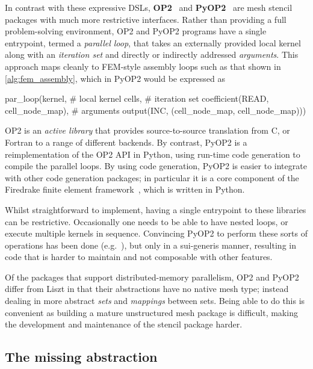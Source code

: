 \documentclass[thesis]{subfiles}
\begin{document}
In contrast with these expressive DSLs, \textbf{OP2}~\cite{mudaligeOP2ActiveLibrary2012} and \textbf{PyOP2}~\cite{rathgeberPyOP2HighLevelFramework2012} are mesh stencil packages with much more restrictive interfaces.
Rather than providing a full problem-solving environment, OP2 and PyOP2 programs have a single entrypoint, termed a \textit{parallel loop}, that takes an externally provided local kernel along with an \textit{iteration set} and directly or indirectly addressed \textit{arguments}.
This approach maps cleanly to FEM-style assembly loops such as that shown in \cref{alg:fem_assembly}, which in PyOP2 would be expressed as

\begin{pyinline}
  par_loop(kernel,                                       # local kernel
           cells,                                        # iteration set
           coefficient(READ, cell_node_map),             # arguments
           output(INC, (cell_node_map, cell_node_map)))
\end{pyinline}

OP2 is an \textit{active library} that provides source-to-source translation from C, \cplusplus or Fortran to a range of different backends.
By contrast, PyOP2 is a reimplementation of the OP2 API in Python, using run-time code generation to compile the parallel loops.
By using code generation, PyOP2 is easier to integrate with other code generation packages; in particular it is a core component of the Firedrake finite element framework~\cite{FiredrakeUserManual}, which is written in Python.

Whilst straightforward to implement, having a single entrypoint to these libraries can be restrictive.
Occasionally one needs to be able to have nested loops, or execute multiple kernels in sequence.
Convincing PyOP2 to perform these sorts of operations has been done (e.g.~\cite{gibsonSlateExtendingFiredrake2020,farrellPCPATCHSoftwareTopological2021}), but only in a sui-generis manner, resulting in code that is harder to maintain and not composable with other features.

Of the packages that support distributed-memory parallelism, OP2 and PyOP2 differ from Liszt in that their abstractions have no native mesh type; instead dealing in more abstract \textit{sets} and \textit{mappings} between sets.
Being able to do this is convenient as building a mature unstructured mesh package is difficult, making the development and maintenance of the stencil package harder.

\subsection{The missing abstraction}
\label{sec:intro_missing_abstraction}
\end{document}
